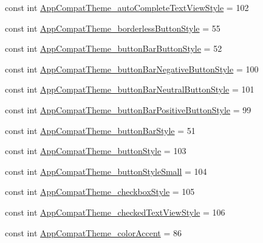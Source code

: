\begin{DoxyCompactItemize}
\item 
const int \mbox{\hyperlink{class_f_w_p_s___app_1_1_droid_1_1_resource_1_1_styleable_ae5d00086efc6031217e6dc5f98d8f417}{App\+Compat\+Theme\+\_\+auto\+Complete\+Text\+View\+Style}} = 102
\item 
const int \mbox{\hyperlink{class_f_w_p_s___app_1_1_droid_1_1_resource_1_1_styleable_acd0c90c2a4d3cc02fb4f21fc3199287a}{App\+Compat\+Theme\+\_\+borderless\+Button\+Style}} = 55
\item 
const int \mbox{\hyperlink{class_f_w_p_s___app_1_1_droid_1_1_resource_1_1_styleable_aaeed4da9b610a45dd91e59bce4058603}{App\+Compat\+Theme\+\_\+button\+Bar\+Button\+Style}} = 52
\item 
const int \mbox{\hyperlink{class_f_w_p_s___app_1_1_droid_1_1_resource_1_1_styleable_a440d3e9065b9e937db428ee7b28ffbfe}{App\+Compat\+Theme\+\_\+button\+Bar\+Negative\+Button\+Style}} = 100
\item 
const int \mbox{\hyperlink{class_f_w_p_s___app_1_1_droid_1_1_resource_1_1_styleable_a7d6dea8e7c764d37a7072c4cb4649a97}{App\+Compat\+Theme\+\_\+button\+Bar\+Neutral\+Button\+Style}} = 101
\item 
const int \mbox{\hyperlink{class_f_w_p_s___app_1_1_droid_1_1_resource_1_1_styleable_a6d5748fdaec050560693085095101e3f}{App\+Compat\+Theme\+\_\+button\+Bar\+Positive\+Button\+Style}} = 99
\item 
const int \mbox{\hyperlink{class_f_w_p_s___app_1_1_droid_1_1_resource_1_1_styleable_aa113d24ac8421dee580abee7fb4106bf}{App\+Compat\+Theme\+\_\+button\+Bar\+Style}} = 51
\item 
const int \mbox{\hyperlink{class_f_w_p_s___app_1_1_droid_1_1_resource_1_1_styleable_a3691a426fac2ccabac49567914bfa1f3}{App\+Compat\+Theme\+\_\+button\+Style}} = 103
\item 
const int \mbox{\hyperlink{class_f_w_p_s___app_1_1_droid_1_1_resource_1_1_styleable_ab8e60bbf0ef2bfbc90f336cac77108fd}{App\+Compat\+Theme\+\_\+button\+Style\+Small}} = 104
\item 
const int \mbox{\hyperlink{class_f_w_p_s___app_1_1_droid_1_1_resource_1_1_styleable_a197778391fb77bd917e3e817cb5c9bc1}{App\+Compat\+Theme\+\_\+checkbox\+Style}} = 105
\item 
const int \mbox{\hyperlink{class_f_w_p_s___app_1_1_droid_1_1_resource_1_1_styleable_ae4ae6c274918a096d30853a9f2b1920b}{App\+Compat\+Theme\+\_\+checked\+Text\+View\+Style}} = 106
\item 
const int \mbox{\hyperlink{class_f_w_p_s___app_1_1_droid_1_1_resource_1_1_styleable_a89ea23e6c19cc7cf7c9ef71b46296989}{App\+Compat\+Theme\+\_\+color\+Accent}} = 86

\end{DoxyCompactItemize}
